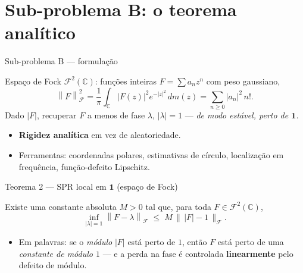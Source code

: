 \documentclass[10pt,aspectratio=169]{beamer}
\newcommand{\C}{\mathbb{C}}
\newcommand{\abs}[1]{\left|#1\right|}
\newcommand{\norm}[1]{\left\|#1\right\|}
\newcommand{\hl}[1]{{\color{accent}\textbf{#1}}}
\begin{document}
\section{Sub-problema B: o teorema analítico}

\begin{frame}{Sub-problema B --- formulação}
  \begin{defbox}[Setup]
    Espaço de Fock $\mathcal{F}^2(\C)$: funções inteiras $F=\sum a_n z^n$
    com peso gaussiano,
    \[
      \norm{F}_{\mathcal{F}}^2
      =\frac1\pi\!\int_{\C}\!\abs{F(z)}^2 e^{-\abs{z}^2}\,dm(z)
      =\sum_{n\ge0}\abs{a_n}^2\,n!.
    \]
    Dado $\abs{F}$, recuperar $F$ a menos de fase $\lambda$,
    $\abs{\lambda}=1$ --- \emph{de modo estável, perto de
    $\mathbf{1}$.}
  \end{defbox}
  \vspace{0.4em}
  \pause
  \begin{itemize}\small
    \setlength{\itemsep}{0.35em}
    \item \hl{Rigidez analítica} em vez de aleatoriedade.
    \item Ferramentas: coordenadas polares, estimativas de círculo,
          localização em frequência, função-defeito Lipschitz.
  \end{itemize}
\end{frame}

\begin{frame}{Teorema 2 --- SPR local em $\mathbf{1}$ (espaço de Fock)}
  \begin{thmbox}
    \small
    Existe uma constante absoluta $M>0$ tal que, para toda
    $F\in\mathcal{F}^2(\C)$,
    \[
      \inf_{\abs{\lambda}=1}\norm{F-\lambda}_{\mathcal{F}}
      \;\le\;
      M\,\bigl\|\,\abs{F}-1\,\bigr\|_{\mathcal{F}}.
    \]
  \end{thmbox}
  \vspace{0.4em}
  \pause
  \begin{itemize}\small
    \setlength{\itemsep}{0.4em}
    \item Em palavras: se o \emph{módulo} $\abs{F}$ está perto de
          $1$, então $F$ está perto de uma \emph{constante de
          módulo $1$} --- e a perda na fase é controlada
          \hl{linearmente} pelo defeito de módulo.
  \end{itemize}
\end{frame}
\end{document}
